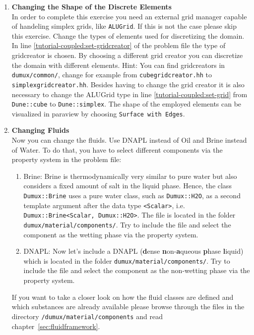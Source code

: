 \begin{enumerate}
  \item \textbf{Changing  the Shape of the Discrete Elements} \\
  In order to complete this exercise you need an external grid manager capable of handeling 
  simplex grids, like \texttt{ALUGrid}. If this is not the case please skip this exercise.
  Change the types of elements used for discretizing the domain. In line \ref{tutorial-coupled:set-gridcreator} of the problem 
  file  the type of gridcreator is chosen. By choosing a different grid creator you can discretize the domain with different elements. 
  Hint: You can find gridcreators in \texttt{dumux/common/}, change for example from \texttt{cubegridcreator.hh} to \texttt{simplexgridcreator.hh}. 
  Besides having to change the grid creator it is also necessary to change the ALUGrid type in line \ref{tutorial-coupled:set-grid} from \texttt{Dune::cube} 
  to \texttt{Dune::simplex}.
  The shape of the employed elements can be visualized in paraview by choosing \texttt{Surface with Edges}. 

\item \textbf{Changing Fluids} \\
Now you can change the fluids. Use DNAPL instead of Oil and Brine instead of Water. To do that, you have to select different components via the property system in the problem file:
\begin{enumerate}
 \item Brine: Brine is thermodynamically very similar to pure water but also considers a fixed amount of salt in the liquid phase. 
  Hence, the class \texttt{Dumux::Brine} uses a pure water class, such as \texttt{Dumux::H2O}, 
  as a second template argument after the data type \texttt{<Scalar>}, i.e. \texttt{Dumux::Brine<Scalar, Dumux::H2O>}. The file is located in the folder \texttt{dumux/material/components/}.
  Try to include the file and select the component as the wetting phase via the property system.
 \item DNAPL:  
  Now let's include a DNAPL (\textbf{d}ense \textbf{n}on-\textbf{a}queous \textbf{p}hase \textbf{l}iquid)
  which is located in the folder \texttt{dumux/material/components/}. Try to include the file and select the component as the non-wetting phase via the property system.
\end{enumerate}
If you want to take a closer look on how the fluid classes are defined and which substances are already available please browse through the files in the directory
\texttt{/dumux/material/components} and read chapter~\ref{sec:fluidframework}.


\end{enumerate}
